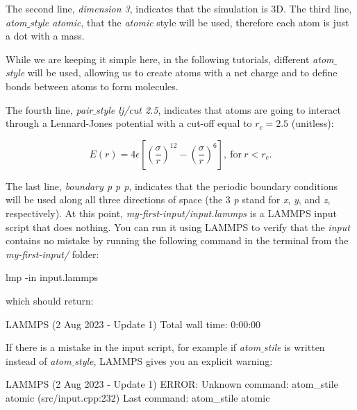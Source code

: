 \noindent The second line, \textit{dimension 3}, indicates that the simulation
is 3D. The third line, \textit{atom$\_$style atomic}, that the \textit{atomic} style
will be used, therefore each atom is just a dot with a mass.

\begin{tcolorbox}[colback=mylightblue!5!white,colframe=mylightblue!75!black,title=About the atom style]
While we are keeping it simple here,
in the following tutorials, different \textit{atom$\_$style} will be used,
allowing us to create atoms with a net charge and to define 
bonds between atoms to form molecules.
\end{tcolorbox}

\noindent The fourth line, \textit{pair$\_$style lj/cut 2.5}, indicates that atoms
are going to interact through a Lennard-Jones potential with
a cut-off equal to $r_c = 2.5$ (unitless):

$$E (r) = 4 \epsilon \left[ \left( \dfrac{\sigma}{r} \right)^{12} - \left( \dfrac{\sigma}{r} \right)^{6} \right], ~ \text{for} ~ r < r_c.$$

The last line, \textit{boundary p p p}, indicates that the
periodic boundary conditions will be used along all three
directions of space (the 3 \textit{p} stand for \textit{x}, \textit{y}, and \textit{z},
respectively).
At this point, \textit{my-first-input/input.lammps} is a 
LAMMPS input script that does nothing.
You can run it using LAMMPS to verify that the \textit{input} contains
no mistake by running the following command in the terminal
from the \textit{my-first-input/}  folder:

\begin{lcverbatim}
lmp -in input.lammps
\end{lcverbatim}

\noindent which should return:

\begin{lcverbatim}
LAMMPS (2 Aug 2023 - Update 1)
Total wall time: 0:00:00
\end{lcverbatim}

\noindent If there is a mistake in the input script, for example if
\textit{atom$\_$stile} is written instead of \textit{atom$\_$style}, LAMMPS
gives you an explicit warning:

\begin{lcverbatim}
LAMMPS (2 Aug 2023 - Update 1)
ERROR: Unknown command: atom_stile  atomic (src/input.cpp:232)
Last command: atom_stile atomic
\end{lcverbatim}

